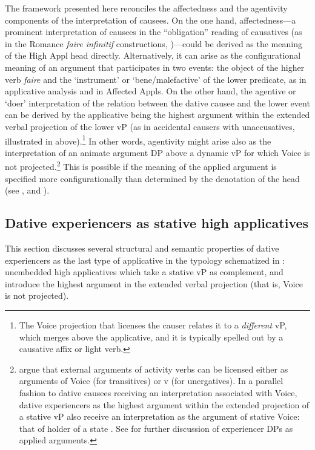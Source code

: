\documentclass[output=paper,colorlinks,citecolor=brown,nonflat]{./langscibook}
\begin{document}
The framework presented here reconciles the affectedness and the agentivity components of the interpretation of causees. On the one hand, affectedness—a prominent interpretation of causees in the “obligation” reading of causatives (as in the Romance \textit{faire infinitif} constructions, \citealt{FolliHarley2007})—could be derived as the meaning of the High Appl head directly. Alternatively, it can arise as the configurational meaning of an argument that participates in two events: the object of the higher verb \textit{faire} and the ‘instrument’ or ‘bene/malefactive’ of the lower predicate, as in  applicative analysis and in Affected Appls. On the other hand, the agentive or ‘doer’ interpretation of the relation between the dative causee and the lower event can be derived by the applicative being the highest argument within the extended verbal projection of the lower vP (as in accidental causers with unaccusatives, illustrated in  above).\footnote{The Voice projection that licenses the causer relates it to a \textit{different} vP, which merges above the applicative, and it is typically spelled out by a causative affix or light verb.} In other words, agentivity might arise also as the interpretation of an animate argument DP above a dynamic vP for which Voice is not projected.\footnote{\citet{TollanOxford2018} argue that external arguments of activity verbs can be licensed either as arguments of Voice (for transitives) or v (for unergatives). In a parallel fashion to dative causees receiving an interpretation associated with Voice, dative experiencers as the highest argument within the extended projection of a stative vP also receive an interpretation as the argument of stative Voice: that of holder of a state \citep{Kratzer1996}. See  for further discussion of experiencer DPs as applied arguments.} This is possible if the meaning of the applied argument is specified more configurationally than determined by the denotation of the head (see \citealt{Cuervo2015Chapter}, and \citealt{WoodMarantz2017}). 

\subsection{Dative experiencers as stative high applicatives}\label{sec:cuervo:4.4}

This section discusses several structural and semantic properties of dative experiencers as the last type of applicative in the typology schematized in : unembedded high applicatives which take a stative vP as complement, and introduce the highest argument in the extended verbal projection (that is, Voice is not projected). 
\end{document}

